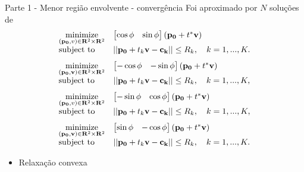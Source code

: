 \documentclass{beamer}					%
\begin{document}
\begin{frame}{Parte 1  - Menor região envolvente - convergência}
	Foi aproximado por $N$ soluções de
	\begin{equation*}
	\begin{array}[t]{ll} 
	\underset{(\mathbf{p_0},v) \in \mathbf{R}^2 \times \mathbf{R}^2}{\text{minimize}} & \begin{bmatrix}
	\cos \phi & \sin \phi\\
	\end{bmatrix} \left (\mathbf{p_0} + t^* \mathbf{v}\right)\\
	\text{subject to} & \left | \left| \mathbf{p_0} + t_k \mathbf{v}-\mathbf{c_k}\right|\right| \leq R_k, \quad k=1,...,K.
	\end{array}
	\end{equation*}
	\begin{equation}\label{eq:convexRelax}
	\begin{array}[t]{ll} 
	\underset{(\mathbf{p_0},\mathbf{v}) \in \mathbf{R}^2 \times \mathbf{R}^2}{\text{minimize}} & \begin{bmatrix}
	-\cos \phi & - \sin \phi\\
	\end{bmatrix} \left (\mathbf{p_0} + t^* \mathbf{v}\right)\\
	\text{subject to} & \left | \left| \mathbf{p_0} + t_k \mathbf{v}-\mathbf{c_k}\right|\right| \leq R_k, \quad k=1,...,K,
	\end{array}
	\end{equation}
	\begin{equation*}
	\begin{array}[t]{ll} 
	\underset{(\mathbf{p_0},v) \in \mathbf{R}^2 \times \mathbf{R}^2}{\text{minimize}} & \begin{bmatrix}
	-\sin \phi & \cos \phi\\
	\end{bmatrix} \left (\mathbf{p_0} + t^*\mathbf{v}\right)\\
	\text{subject to} & \left | \left|\mathbf{p_0} + t_k \mathbf{v}-\mathbf{c_k}\right|\right| \leq R_k, \quad k=1,...,K,
	\end{array}
	\end{equation*}
	\begin{equation*}
	\begin{array}[t]{ll} 
	\underset{(\mathbf{p_0},\mathbf{v}) \in \mathbf{R}^2 \times \mathbf{R}^2}{\text{minimize}} & \begin{bmatrix}
	\sin \phi & - \cos \phi\\
	\end{bmatrix} \left (\mathbf{p_0} + t^*\mathbf{v} \right)\\
	\text{subject to} & \left | \left| \mathbf{p_0} + t_k \mathbf{v}-\mathbf{c_k}\right|\right| \leq R_k, \quad k=1,...,K.
	\end{array}
	\end{equation*}
	\begin{itemize}
		\item Relaxação convexa\\
	\end{itemize}
\end{frame}
\end{document}

